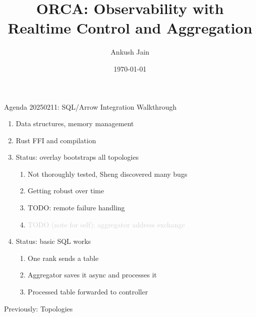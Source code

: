 \documentclass[]{beamer}
\title{ORCA: Observability with Realtime Control and Aggregation}
\author[Left Text]{Ankush Jain}
\institute{CMU}
\date{\today}
\begin{document}

\begin{frame}{Agenda 20250211: SQL/Arrow Integration Walkthrough}
	\begin{enumerate}
		\item Data structures, memory management
    \item Rust FFI and compilation
    \item Status: overlay bootstraps all topologies
      \begin{enumerate}
        \item Not thoroughly tested, Sheng discovered many bugs
        \item Getting robust over time
        \item TODO: remote failure handling
        \item \textcolor{lightgray}{TODO (note for self): aggregator address exchange}
      \end{enumerate}
    \item Status: basic SQL works
      \begin{enumerate}
        \item One rank sends a table
        \item Aggregator saves it async and processes it
        \item Processed table forwarded to controller
      \end{enumerate}
	\end{enumerate}
\end{frame}

\begin{frame}{Previously: Topologies}
\end{frame}
\end{document}
